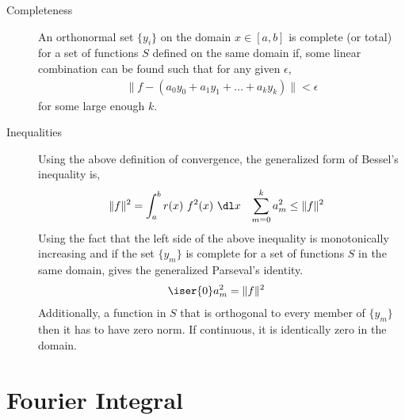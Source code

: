\begin{description}
    \item[Completeness] An orthonormal set $ \{y_i\} $ on the domain $ x \in [a, b] $
        is complete (or total) for a set of functions $ S $ defined on the same domain if,
        some linear combination can be found such that for any given $ \epsilon $,
        \begin{align}
            \lVert f - (a_0y_0 + a_1y_1 + \dots + a_ky_k) \rVert < \epsilon
        \end{align}
        for some large enough $ k $.

    \item[Inequalities] Using the above definition of convergence, the generalized form
        of Bessel's inequality is,
        \begin{align}
            \lVert f \rVert^2    & = \int_{a}^{b} r(x)\ f^2(x)\ \dl x &
            \sum_{m=0}^{k} a^2_m & \leq \lVert f \rVert^2
        \end{align}
        Using the fact that the left side of the above inequality is monotonically
        increasing and if the set $ \{y_m\} $ is complete for a set of functions $ S $
        in the same domain, gives the generalized Parseval's identity.
        \begin{align}
            \iser{0} a^2_m & = \lVert f \rVert^2
        \end{align}
        Additionally, a function in $ S $ that is orthogonal to every member of
        $ \{y_m\} $ then it has to have zero norm. If continuous, it is identically
        zero in the domain.

\end{description}

\section{Fourier Integral}

